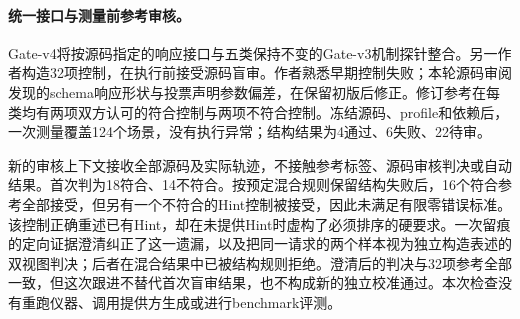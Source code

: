 \paragraph{统一接口与测量前参考审核。}
Gate-v4将按源码指定的响应接口与五类保持不变的Gate-v3机制探针整合。另一作者构造32项控制，在执行前接受源码盲审。作者熟悉早期控制失败；本轮源码审阅发现的schema响应形状与投票声明参数偏差，在保留初版后修正。修订参考在每类均有两项双方认可的符合控制与两项不符合控制。冻结源码、profile和依赖后，一次测量覆盖124个场景，没有执行异常；结构结果为4通过、6失败、22待审。

新的审核上下文接收全部源码及实际轨迹，不接触参考标签、源码审核判决或自动结果。首次判为18符合、14不符合。按预定混合规则保留结构失败后，16个符合参考全部接受，但另有一个不符合的Hint控制被接受，因此未满足有限零错误标准。该控制正确重述已有Hint，却在未提供Hint时虚构了必须排序的硬要求。一次留痕的定向证据澄清纠正了这一遗漏，以及把同一请求的两个样本视为独立构造表述的双视图判决；后者在混合结果中已被结构规则拒绝。澄清后的判决与32项参考全部一致，但这次跟进不替代首次盲审结果，也不构成新的独立校准通过。本次检查没有重跑仪器、调用提供方生成或进行benchmark评测。
